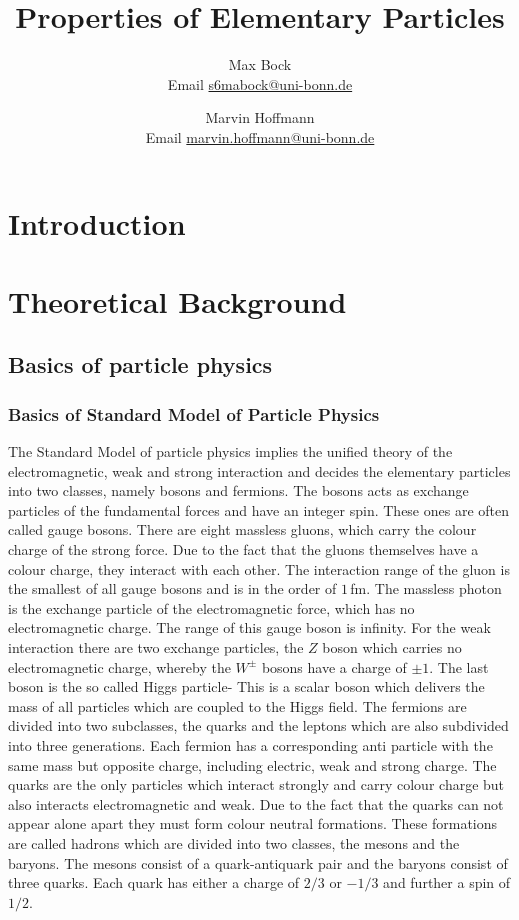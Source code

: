 \documentclass[10pt, a4paper, notitlepage, DIV=15]{scrartcl}
\title{Properties of Elementary Particles}
\author{Max Bock \\ Email \href{mailto:s6mabock@uni-bonn.de}{s6mabock@uni-bonn.de} 
	\and Marvin Hoffmann \\ Email \href{mailto:marvin.hoffmann@uni-bonn.de}{marvin.hoffmann@uni-bonn.de} }
\begin{document}
\maketitle
\tableofcontents
\newpage
\section{Introduction}

\section{Theoretical Background}
\subsection{Basics of particle physics}
\subsubsection{Basics of Standard Model of Particle Physics}
The Standard Model of particle physics implies the unified theory of the electromagnetic, weak and strong interaction and decides the elementary particles into two classes, namely bosons and fermions. \newline
The bosons acts as exchange particles of the fundamental forces and have an integer spin. These ones are often called gauge bosons. There are eight massless gluons, which carry the colour charge of the strong force. Due to the fact that the gluons themselves have a colour charge, they interact with each other. The interaction range of the gluon is the smallest of all gauge bosons and is in the order of $1\,$fm. The massless photon is the exchange particle of the electromagnetic force, which has no electromagnetic charge. The range of this gauge boson is infinity. For the weak interaction there are two exchange particles, the $Z$ boson which carries no electromagnetic charge, whereby the $W^{\pm}$ bosons have a charge of $\pm 1$. The last boson is the so called Higgs particle- This is a scalar boson which delivers the mass of all particles which are coupled to the Higgs field.  \newline
The fermions are divided into two subclasses, the quarks and the leptons which are also subdivided into three generations. Each fermion has a corresponding anti particle with the same mass but opposite charge, including electric, weak and strong charge.\newline
The quarks are the only particles which interact strongly and carry colour charge but also interacts electromagnetic and weak. Due to the fact that the quarks can not appear alone apart they must form colour neutral formations. These formations are called hadrons which are divided into two classes, the mesons and the baryons. The mesons consist of a quark-antiquark pair and the baryons consist of three quarks. Each quark has either a charge of $2/3$ or $-1/3$ and further a spin of $1/2$. 
\end{document}
